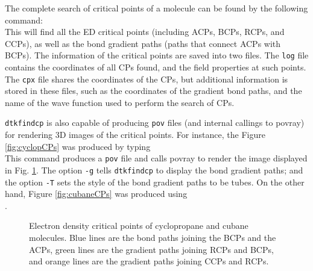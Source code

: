 The complete search of critical points of a molecule can be found by the following command:\\
This will find all the ED critical points (including ACPs, BCPs, RCPs, and CCPs), as well as the bond gradient paths (paths that connect ACPs with BCPs). The information of the critical points are saved into two files. The \texttt{log} file contains the coordinates of all CPs found, and the field properties at such points. The \texttt{cpx} file shares the coordinates of the CPs, but additional information is stored in these files, such as the coordinates of the gradient bond paths, and the name of the wave function used to perform the search of CPs.

\texttt{dtkfindcp} is also capable of producing \texttt{pov} files (and internal callings to povray) for rendering 3D images of the critical points. For instance, the Figure \ref{fig:cyclopCPs} was produced by typing\\
This command produces a \texttt{pov} file and calls povray to render the image displayed in Fig. \ref{fig:dtkfindcpusex}. The option \texttt{-g} tells \texttt{dtkfindcp} to display the bond gradient paths; and the option \texttt{-T} sets the style of the bond gradient paths to be tubes. On the other hand, Figure \ref{fig:cubaneCPs} was produced using \\.
%
\begin{figure}[hb!]
\centering
{}
\caption{Electron density critical points of  cyclopropane and
 cubane molecules. Blue lines are the bond paths joining the BCPs and the ACPs,
green lines are the gradient paths joining RCPs and BCPs, and orange lines are the
gradient paths joining CCPs and RCPs.}\label{fig:dtkfindcpusex}
\end{figure}
%

